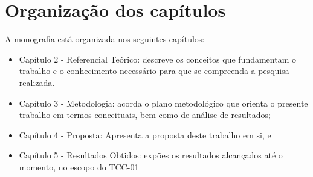 \section*{Organização dos capítulos}

A monografia está organizada nos seguintes capítulos:

\begin{itemize}


        \item Capítulo 2 - Referencial Teórico: descreve os conceitos que fundamentam o trabalho e o conhecimento necessário para que se compreenda a pesquisa realizada.
        \item Capítulo 3 - Metodologia: acorda o plano metodológico que orienta o presente trabalho em termos conceituais, bem como de análise de resultados;

        \item Capítulo 4 - Proposta: Apresenta a proposta deste trabalho em si, e

        \item Capítulo 5 - Resultados Obtidos: expões os resultados alcançados até o momento, no escopo do TCC-01
          
\end{itemize}
